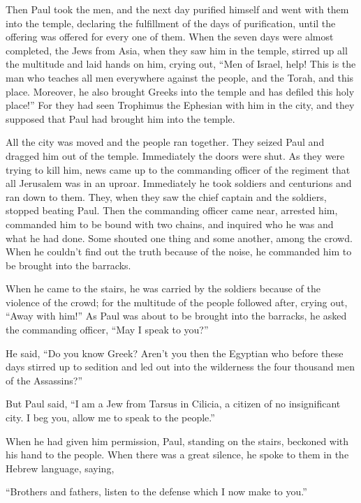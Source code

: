 \myverse{}Then Paul took the men, and the next day purified himself and
went with them into the temple, declaring the fulfillment of the days of purification, until the offering
was offered for every one of them.
\myverse{}When the seven days were almost completed, the Jews from Asia, when they
saw him in the temple, stirred up all the multitude and laid hands on him,
\myverse{}crying out, “Men of Israel, help! This is the man who teaches all men everywhere
against the people, and the Torah, and this place. Moreover, he also brought Greeks into the temple and
has defiled this holy place!”
\myverse{}For they had seen Trophimus the Ephesian with him in the city, and they supposed
that Paul had brought him into the temple.

\myverse{}All the city was moved and the people ran together. They seized
Paul and dragged him out of the temple. Immediately the doors were shut.
\myverse{}As they were trying to kill him, news came up to the commanding officer of
the regiment that all Jerusalem was in an uproar.
\myverse{}Immediately he took soldiers and centurions and ran down to them. They, when
they saw the chief captain and the soldiers, stopped beating Paul.
\myverse{}Then the commanding officer came near, arrested him, commanded him to be
bound with two chains, and inquired who he was and what he had done.
\myverse{}Some shouted one thing and some another, among the crowd. When he couldn’t
find out the truth because of the noise, he commanded him to be brought into the barracks.

\myverse{}When he came to the stairs, he was carried by the soldiers because
of the violence of the crowd;
\myverse{}for the multitude of the people followed after, crying out, “Away with him!”
\myverse{}As Paul was about to be brought into the barracks, he asked the commanding
officer, “May I speak to you?”

He said, “Do you know Greek?
\myverse{}Aren’t you then the Egyptian who before these days stirred up to sedition
and led out into the wilderness the four thousand men of the Assassins?”

\myverse{}But Paul said, “I am a Jew from Tarsus in Cilicia, a citizen
of no insignificant city. I beg you, allow me to speak to the people.”

\myverse{}When he had given him permission, Paul, standing on the stairs,
beckoned with his hand to the people. When there was a great silence, he spoke to them in the Hebrew language,
saying,


\mychapter{} \myverse*{}“Brothers and fathers, listen to the defense which I now make
to you.”


